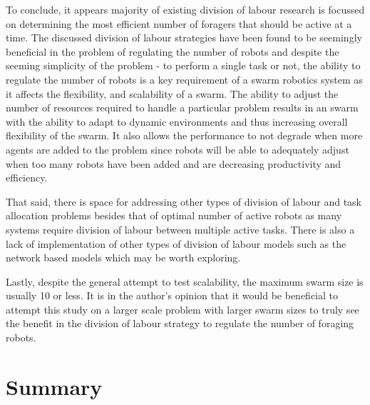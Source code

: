 To conclude, it appears majority of existing division of labour research is focussed on determining the most efficient number of foragers that should be active at a time. The discussed division of labour strategies have been found to be seemingly beneficial in the problem of regulating the number of robots and despite the seeming simplicity of the problem - to perform a single task or not, the ability to regulate the number of robots is a key requirement of a swarm robotics system as it affects the flexibility, and scalability of a swarm. The ability to adjust the number of resources required to handle a particular problem results in an swarm with the ability to adapt to dynamic environments and thus increasing overall flexibility of the swarm. It also allows the performance to not degrade when more agents are added to the problem since robots will be able to adequately adjust when too many robots have been added and are decreasing productivity and efficiency. 

That said, there is space for addressing other types of division of labour and task allocation problems besides that of optimal number of active robots as many systems require division of labour between multiple active tasks. There is also a lack of implementation of other types of division of labour models such as the network based models which may be worth exploring.

Lastly, despite the general attempt to test scalability, the maximum swarm size is usually 10 or less. It is in the author's opinion that it would be beneficial to attempt this study on a larger scale problem with larger swarm sizes to truly see the benefit in the division of labour strategy to regulate the number of foraging robots. 

\section{Summary}
\label{sec:second:summary}
